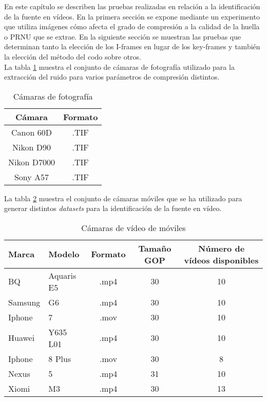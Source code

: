 En este capítulo se describen las pruebas realizadas en relación a la identificación de la fuente en vídeos. En la primera sección se expone mediante un experimento que utiliza imágenes cómo afecta el grado de compresión a la calidad de la huella o PRNU que se extrae. En la siguiente sección se muestran las pruebas que determinan tanto la elección de los I-frames en lugar de los key-frames y también la elección del método del codo sobre otros. \\

La tabla \ref{tabla:fotos} muestra el conjunto de cámaras de fotografía utilizado para la extracción del ruido para varios parámetros de compresión distintos. \\

\begin{table}[!htb]
    \centering
        \begin{tabular}{|c|c|}
        \hline
        \rowcolor[gray]{0.9}\textbf{Cámara} & \textbf{Formato} \\ 
        \hline
        Canon 60D & .TIF \\ 
        \hline
        Nikon D90 & .TIF \\ 
        \hline
        Nikon D7000 & .TIF \\ 
        \hline
        Sony A57 & .TIF \\ 
        \hline
        \end{tabular}
    \caption{Cámaras de fotografía}
    \label{tabla:fotos}
\end{table}

La tabla \ref{tabla:videos} muestra el conjunto de cámaras móviles que se ha utilizado para generar distintos \textit{datasets} para la identificación de la fuente en vídeo. \\

\begin{table}[!htb]
    \centering
        \begin{tabular}{|l|l|c|c|c|}
        \hline
        \rowcolor[gray]{0.9}
        \textbf{Marca} & \textbf{Modelo} & \textbf{Formato} & \textbf{Tama\~no GOP} & \textbf{Número de vídeos disponibles} \\ \hline
        BQ & Aquaris E5 & .mp4 & 30 & 10 \\ \hline
        Samsung & G6 & .mp4 & 30 & 10 \\ \hline
        Iphone & 7 & .mov & 30 & 10 \\ \hline
        Huawei & Y635 L01 & .mp4 & 30 & 10 \\ \hline
        Iphone & 8 Plus & .mov & 30 & 8 \\ \hline
        Nexus & 5 & .mp4 & 31 & 10 \\ \hline
        Xiomi & M3 & .mp4 & 30 & 13 \\ \hline
        \end{tabular}
    \caption{Cámaras de vídeo de móviles}
    \label{tabla:videos}
\end{table}

